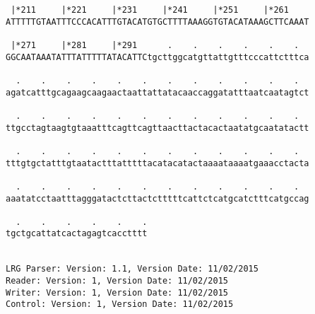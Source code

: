 \documentclass{article}
\begin{document}
\begin{Verbatim}
 |*211     |*221     |*231     |*241     |*251     |*261    
ATTTTTGTAATTTCCCACATTTGTACATGTGCTTTTAAAGGTGTACATAAAGCTTCAAAT
                                                            
 |*271     |*281     |*291      .    .    .    .    .    .  
GGCAATAAATATTTATTTTTATACATTCtgcttggcatgttattgtttcccattctttca
                                                            
  .    .    .    .    .    .    .    .    .    .    .    .  
agatcatttgcagaagcaagaactaattattatacaaccaggatatttaatcaatagtct
                                                            
  .    .    .    .    .    .    .    .    .    .    .    .  
ttgcctagtaagtgtaaatttcagttcagttaacttactacactaatatgcaatatactt
                                                            
  .    .    .    .    .    .    .    .    .    .    .    .  
tttgtgctatttgtaatactttatttttacatacatactaaaataaaatgaaacctacta
                                                            
  .    .    .    .    .    .    .    .    .    .    .    .  
aaatatcctaatttagggatactcttactctttttcattctcatgcatctttcatgccag
                                                            
  .    .    .    .    .    .
tgctgcattatcactagagtcacctttt
                            
                            
LRG Parser: Version: 1.1, Version Date: 11/02/2015
Reader: Version: 1, Version Date: 11/02/2015
Writer: Version: 1, Version Date: 11/02/2015
Control: Version: 1, Version Date: 11/02/2015
\end{Verbatim}
\end{document}

